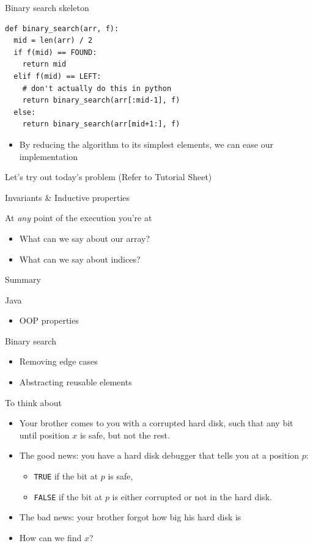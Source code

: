 \documentclass[presentation]{beamer}
\begin{document}
\begin{frame}[label={sec:org9a2f652},fragile]{Binary search skeleton}
 \begin{verbatim}
def binary_search(arr, f):
  mid = len(arr) / 2
  if f(mid) == FOUND:
    return mid
  elif f(mid) == LEFT:
    # don't actually do this in python
    return binary_search(arr[:mid-1], f)
  else:
    return binary_search(arr[mid+1:], f)
\end{verbatim}
\begin{itemize}
\item By reducing the algorithm to its simplest elements, we can ease
our implementation
\end{itemize}
\end{frame}
\begin{frame}[label={sec:org8be1cd3}]{Let's try out today's problem}
(Refer to Tutorial Sheet)
\end{frame}
\begin{frame}[label={sec:org50fbd87}]{Invariants \& Inductive properties}
\begin{block}{At \emph{any} point of the execution you're at}
\begin{itemize}
\item What can we say about our array?
\item What can we say about \alert{indices}?
\end{itemize}
\end{block}
\end{frame}
\begin{frame}[label={sec:org31f99a6}]{Summary}
\begin{block}{Java}
\begin{itemize}
\item OOP properties
\end{itemize}
\end{block}
\begin{block}{Binary search}
\begin{itemize}
\item Removing edge cases
\item Abstracting reusable elements
\end{itemize}
\end{block}
\end{frame}
\begin{frame}[<+->][label={sec:orgb88bf83},fragile]{To think about}
 \begin{itemize}
\item Your brother comes to you with a corrupted hard disk, such that any
bit until position \(x\) is safe, but not the rest.
\item The good news: you have a hard disk debugger that tells you at a
position \(p\):
\begin{itemize}
\item \texttt{TRUE} if the bit at \(p\) is safe,
\item \texttt{FALSE} if the bit at \(p\) is either corrupted or not in the hard disk.
\end{itemize}
\item The bad news: your brother forgot how big his hard disk is
\item How can we find \(x\)?
\end{itemize}
\end{frame}
\end{document}
